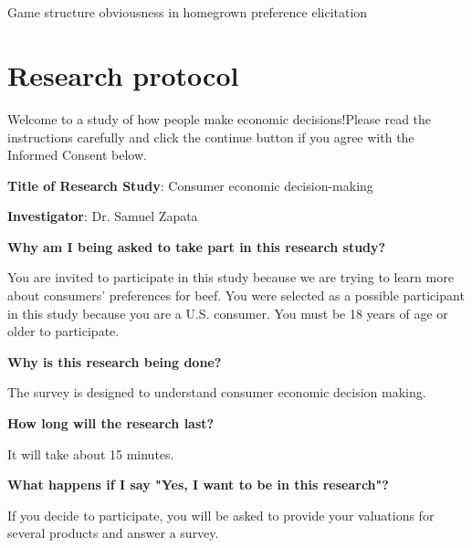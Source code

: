 \documentclass[12pt]{article}
\begin{document}
\newpage
	\singlespacing
	\appendix
	\setcounter{table}{0}
	\setcounter{figure}{0}
	\renewcommand{\thetable}{A\arabic{table}}
	\renewcommand{\thefigure}{A\arabic{figure}}
	\setcounter{page}{1}
	\renewcommand{\thesubsection}{\Alph{subsection}}

	\section*{}
	{\centering \LARGE Game structure obviousness in homegrown preference elicitation
		
		\vspace{0.5cm}
		\renewcommand*{\thefootnote}{\fnsymbol{footnote}}
		\setcounter{footnote}{0}
		
		\large
        }


        
\section{Research protocol}

Welcome to a study of how people make economic decisions!Please read the instructions carefully and click the continue button if you agree with the Informed Consent below.

\textbf{Title of Research Study}: Consumer economic decision-making

\textbf{Investigator}: Dr. Samuel Zapata

\textbf{Why am I being asked to take part in this research study?}

You are invited to participate in this study because we are trying to learn more about consumers' preferences for beef. You were selected as a possible participant in this study because you are a U.S. consumer. You must be 18 years of age or older to participate. \par
\textbf{Why is this research being done?} \par

The survey is designed to understand consumer economic decision making. \par

\textbf{How long will the research last?} \par
It will take about 15 minutes. \par
\textbf{What happens if I say "Yes, I want to be in this research"?} \par
If you decide to participate, you will be asked to provide your valuations for several products and answer a survey. \par
\end{document}
